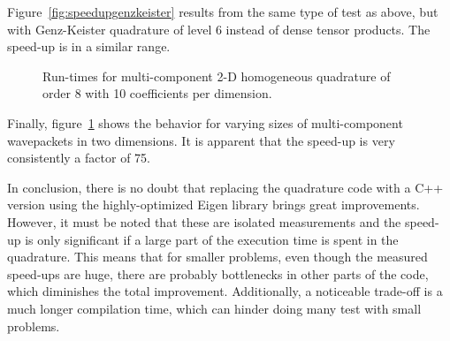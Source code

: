 Figure~\ref{fig:speedupgenzkeister} results from the same type of test as above,
but with Genz-Keister quadrature of level 6 instead of dense tensor products.
The speed-up is in a similar range.

\begin{figure}
  \center
  
  \caption{Run-times for multi-component 2-D homogeneous quadrature of order 8
    with 10 coefficients per dimension.}
  \label{fig:speedupncomps}
\end{figure}

Finally, figure~\ref{fig:speedupncomps} shows the behavior for varying sizes
of multi-component wavepackets in two dimensions.
It is apparent that the speed-up is very consistently a factor of 75.

In conclusion, there is no doubt that replacing the quadrature code with a C++
version using the highly-optimized Eigen library brings great improvements.
However, it must be noted that these are isolated measurements and the speed-up
is only significant if a large part of the execution time is spent in the
quadrature.
This means that for smaller problems, even though the measured speed-ups are
huge, there are probably bottlenecks in other parts of the code, which
diminishes the total improvement.
Additionally, a noticeable trade-off is a much longer compilation time, which
can hinder doing many test with small problems.
